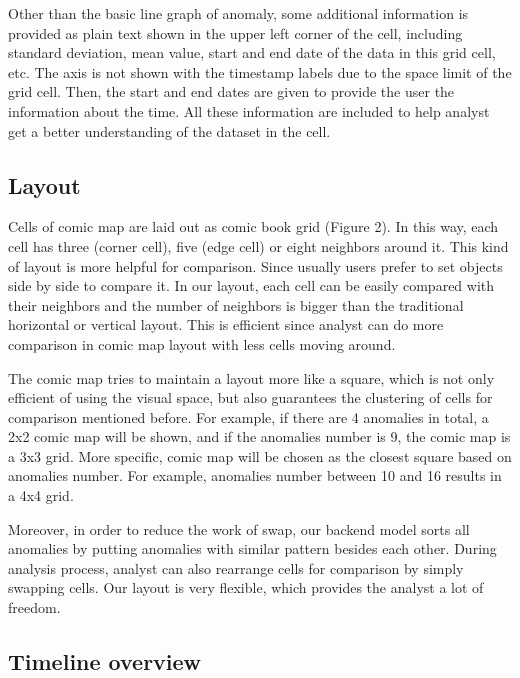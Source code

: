 \documentclass{vgtc}                          %
\begin{document}
Other than the basic line graph of anomaly, some additional information is provided as plain text shown in the upper left corner of the cell, including standard deviation, mean value, start and end date of the data in this grid cell, etc. The axis is not shown with the timestamp labels due to the space limit of the grid cell. Then, the start and end dates are given to provide the user the information about the time. All these information are included to help analyst get a better understanding of the dataset in the cell.

\subsection{Layout}
Cells of comic map are laid out as comic book grid (Figure 2). In this way, each cell has three (corner cell), five (edge cell) or eight neighbors around it. This kind of layout is more helpful for comparison. Since usually users prefer to set objects side by side to compare it. In our layout, each cell can be easily compared with their neighbors and the number of neighbors is bigger than the traditional horizontal or vertical layout. This is efficient since analyst can do more comparison in comic map layout with less cells moving around.

The comic map tries to maintain a layout more like a square, which is not only efficient of using the visual space, but also guarantees the clustering of cells for comparison mentioned before. For example, if there are 4 anomalies in total, a 2x2 comic map will be shown, and if the anomalies number is 9, the comic map is a 3x3 grid. More specific, comic map will be chosen as the closest square based on anomalies number. For example, anomalies number between 10 and 16 results in a 4x4 grid.

Moreover, in order to reduce the work of swap, our backend model sorts all anomalies by putting anomalies with similar pattern besides each other. During analysis process, analyst can also rearrange cells for comparison by simply swapping cells. Our layout is very flexible, which provides the analyst a lot of freedom.

\subsection{Timeline overview}
\end{document}
